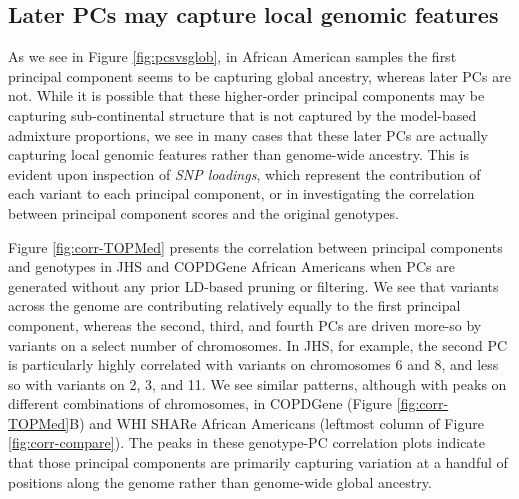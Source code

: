 \documentclass[12pt]{article}
\begin{document}
\subsection{Later PCs may capture local genomic features}
\label{sec:CorrPlots}

%
%


As we see in Figure \ref{fig:pcsvsglob}, in African American samples the first principal component seems to be capturing global ancestry, whereas later PCs are not.
While it is possible that these higher-order principal components may be capturing sub-continental structure that is not captured by the model-based admixture proportions, we see in many cases that these later PCs are actually capturing local genomic features rather than genome-wide ancestry. 
This is evident upon inspection of \textit{SNP loadings}, which represent the contribution of each variant to each principal component, or in investigating the correlation between principal component scores and the original genotypes.

Figure \ref{fig:corr-TOPMed} presents the correlation between principal components and genotypes in JHS and COPDGene African Americans when PCs are generated without any prior LD-based pruning or filtering.
We see that variants across the genome are contributing relatively equally to the first principal component, whereas the second, third, and fourth PCs are driven more-so by variants on a select number of chromosomes.
In JHS, for example, the second PC is particularly highly correlated with variants on chromosomes 6 and 8, and less so with variants on 2, 3, and 11.
We see similar patterns, although with peaks on different combinations of chromosomes, in COPDGene (Figure \ref{fig:corr-TOPMed}B) and WHI SHARe African Americans (leftmost column of Figure \ref{fig:corr-compare}).
The peaks in these genotype-PC correlation plots indicate that those principal components are primarily capturing variation at a handful of positions along the genome rather than genome-wide global ancestry.
\end{document}
